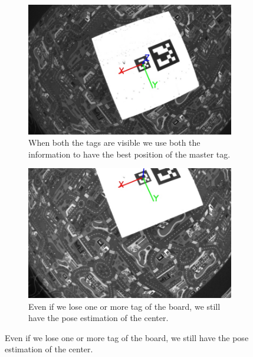 \begin{figure}[!htbp]
   \begin{subfigure}[b]{0.45\textwidth}
        \includegraphics[width=\textwidth]{img/frame2.jpg}
        \caption{When both the tags are visible we use both the information to have the best position of the master tag.}
        \label{fig:three}
   \end{subfigure}\hfill
    \begin{subfigure}[b]{0.45\textwidth}
        \includegraphics[width=\textwidth]{img/frame3.jpg}
        \caption{Even if we lose one or more tag of the board, we still have the pose estimation of the center.}
        \label{fig:four}
   \end{subfigure}
   

\end{figure}
